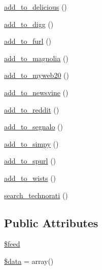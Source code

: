\begin{DoxyCompactItemize}
\item 
\hyperlink{class_simple_pie___item_acedd59c66ccb4656251dfe050b732d7d}{add\-\_\-to\-\_\-delicious} ()
\item 
\hyperlink{class_simple_pie___item_aee2fad829c0ed6d5ed0f07f27e879055}{add\-\_\-to\-\_\-digg} ()
\item 
\hyperlink{class_simple_pie___item_a6230b7203a66b34635180f6479525171}{add\-\_\-to\-\_\-furl} ()
\item 
\hyperlink{class_simple_pie___item_a5d6ed49375627d39b0b4d8074672ddcb}{add\-\_\-to\-\_\-magnolia} ()
\item 
\hyperlink{class_simple_pie___item_a3a7ea5da89f7a84d0cb7b5588704ece1}{add\-\_\-to\-\_\-myweb20} ()
\item 
\hyperlink{class_simple_pie___item_ad2ab26f74fe2cc3f79854c82744ddd29}{add\-\_\-to\-\_\-newsvine} ()
\item 
\hyperlink{class_simple_pie___item_a6da6f7c584a834d5619bd68610134fa9}{add\-\_\-to\-\_\-reddit} ()
\item 
\hyperlink{class_simple_pie___item_a2c406329bd0b716007cd668316297b10}{add\-\_\-to\-\_\-segnalo} ()
\item 
\hyperlink{class_simple_pie___item_a2b11f5ded970180df4d1d5039444d715}{add\-\_\-to\-\_\-simpy} ()
\item 
\hyperlink{class_simple_pie___item_a8af4366cb3e22c055a8ec62cf8bba9b8}{add\-\_\-to\-\_\-spurl} ()
\item 
\hyperlink{class_simple_pie___item_aef29eb799bcdfadd05faeb1e4df1493c}{add\-\_\-to\-\_\-wists} ()
\item 
\hyperlink{class_simple_pie___item_ad1e8b117871a91b236c1ff54aa606fec}{search\-\_\-technorati} ()
\end{DoxyCompactItemize}
\subsection*{Public Attributes}
\begin{DoxyCompactItemize}
\item 
\hyperlink{class_simple_pie___item_af80f074434886c3f285fb38777225d2e}{\$feed}
\item 
\hyperlink{class_simple_pie___item_a25853fcaf6a022029cfb7d7288e00871}{\$data} = array()
\end{DoxyCompactItemize}


